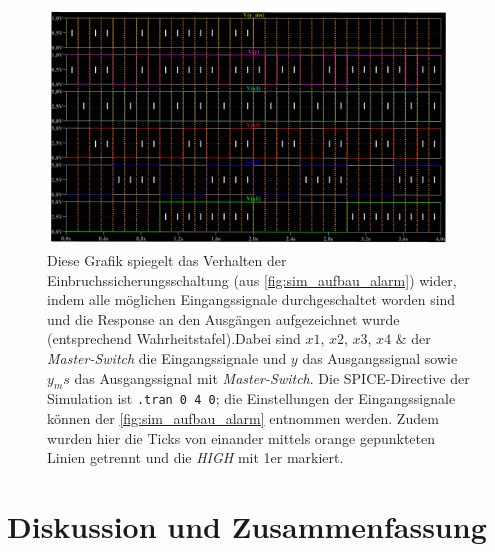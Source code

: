 \documentclass[12pt,english,ngerman]{scrartcl}
\begin{document}
\begin{figure}[H]
  \centering
    \includegraphics[width=0.95\textwidth]{./simdaten_lab/logic/auswertungalarm.jpg}
  \caption{Diese Grafik spiegelt das Verhalten der
    Einbruchssicherungsschaltung (aus \autoref{fig:sim_aufbau_alarm}) wider, indem alle
    möglichen Eingangssignale durchgeschaltet worden sind und die Response an den
    Ausgängen aufgezeichnet wurde (entsprechend Wahrheitstafel).Dabei sind $x1$, $x2$, $x3$, $x4$ \&
    der \textit{Master-Switch} die Eingangssignale und $y$ das Ausgangssignal sowie $y_ms$
    das Ausgangssignal mit \textit{Master-Switch}. Die
    SPICE-Directive der Simulation ist \texttt{.tran 0 4 0}; die
    Einstellungen der Eingangssignale können der \autoref{fig:sim_aufbau_alarm}
  entnommen werden. Zudem wurden hier die Ticks von einander mittels orange gepunkteten Linien getrennt und die \textit{HIGH} mit 1er markiert.}
  \label{fig:sim_alarm_wahrheit_aus}
\end{figure}

\section{Diskussion und Zusammenfassung}\label{sec:Diskussion} 
\end{document}

